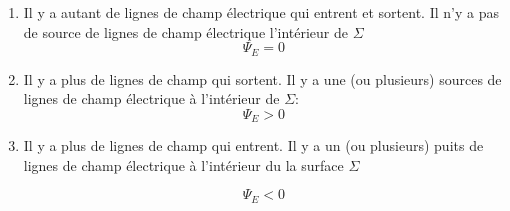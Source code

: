 \documentclass[
    11pt,
    a4paper,
    oneside,
    headinlcude, footinclude,
    twoside,
]{report}
\begin{document}
\begin{enumerate}
    \item 
        \begin{center}
            \begin{minipage}{.5\linewidth}
                \setlength{\parskip}{.3em}
                Il y a autant de lignes de champ électrique qui entrent et
                sortent. Il n'y a pas de source de lignes de champ électrique
                l'intérieur de $\Sigma$ $$\Psi_E = 0$$
            \end{minipage}
            \begin{minipage}{.49\linewidth}
            \end{minipage}
        \end{center}

    \item 
        \begin{center}
            \begin{minipage}{.5\linewidth}
                \setlength{\parskip}{.3em}
                Il y a plus de lignes de champ qui sortent. Il y a une (ou
                plusieurs) sources de lignes de champ électrique à l'intérieur
                de $\Sigma$:
                $$\Psi_E > 0$$
            \end{minipage}
            \begin{minipage}{.49\linewidth}
            \end{minipage}
        \end{center}
    \item 

        \begin{center}
            \begin{minipage}{.5\linewidth}
                \setlength{\parskip}{.3em}
                Il y a plus de lignes de champ qui entrent. Il y a un (ou
                plusieurs) puits de lignes de champ électrique à l'intérieur du
                la surface $\Sigma$

                $$\Psi_E < 0$$
            \end{minipage}
            \begin{minipage}{.49\linewidth}
            \end{minipage}
        \end{center}
\end{enumerate}
\end{document}
